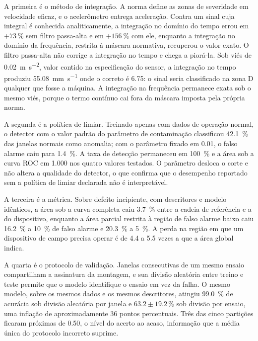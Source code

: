 A primeira é o método de integração. A norma define as zonas de severidade em velocidade
eficaz, e o acelerômetro entrega aceleração. Contra um sinal cuja integral é conhecida
analiticamente, a integração no domínio do tempo errou em $+\SI{73}{\percent}$ sem filtro
passa-alta e em $+\SI{156}{\percent}$ com ele, enquanto a integração no domínio da
frequência, restrita à máscara normativa, recuperou o valor exato. O filtro passa-alta não
corrige a integração no tempo e chega a piorá-la. Sob viés de
\SI{0,02}{\meter\per\second\squared}, valor contido na especificação do sensor, a
integração no tempo produziu \SI{55,08}{\milli\meter\per\second} onde o correto é
\num{6,75}: o sinal seria classificado na zona D qualquer que fosse a máquina. A integração na
frequência permanece exata sob o mesmo viés, porque o termo contínuo cai fora da máscara
imposta pela própria norma.

A segunda é a política de limiar. Treinado apenas com dados de operação normal, o detector
com o valor padrão do parâmetro de contaminação classificou \SI{42,1}{\percent} das
janelas normais como anomalia; com o parâmetro fixado em \num{0,01}, o falso alarme caiu
para \SI{1,4}{\percent}. A taxa de detecção permaneceu em \SI{100}{\percent} e a área sob
a curva ROC em \num{1,000} nos quatro valores testados. O parâmetro desloca o corte e não
altera a qualidade do detector, o que confirma que o desempenho reportado sem a política
de limiar declarada não é interpretável.

A terceira é a métrica. Sobre defeito incipiente, com descritores e modelo idênticos, a
área sob a curva completa caiu \SI{3,7}{\percent} entre a cadeia de referência e a do
dispositivo, enquanto a área parcial restrita à região de falso alarme baixo caiu
\SI{16,2}{\percent} a \SI{10}{\percent} de falso alarme e \SI{20,3}{\percent} a
\SI{5}{\percent}. A perda na região em que um dispositivo de campo precisa operar é de
\num{4,4} a \num{5,5} vezes a que a área global indica.

A quarta é o protocolo de validação. Janelas consecutivas de um mesmo ensaio
compartilham a assinatura da montagem, e sua divisão aleatória entre treino e teste permite
que o modelo identifique o ensaio em vez da falha. O mesmo modelo, sobre os mesmos dados e
os mesmos descritores, atingiu \SI{99,0}{\percent} de acurácia sob divisão aleatória por
janela e $\num{63,2} \pm \num{19,2}\,\si{\percent}$ sob divisão por ensaio, uma inflação de
aproximadamente \num{36} pontos percentuais. Três das cinco partições ficaram próximas de
\num{0,50}, o nível do acerto ao acaso, informação que a média única do protocolo
incorreto suprime.

